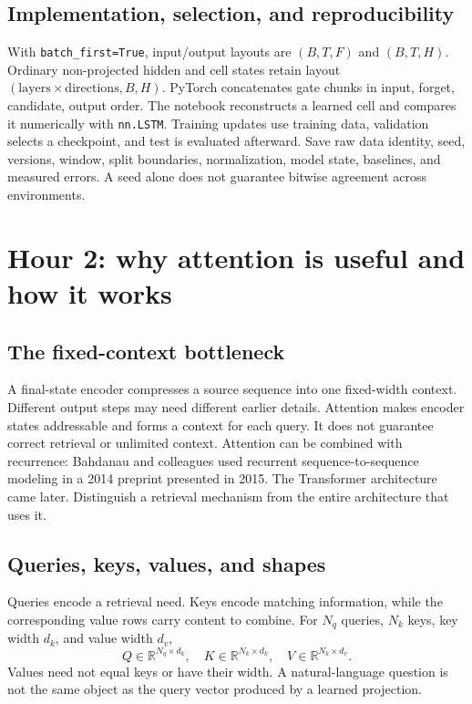 \subsection{Implementation, selection, and reproducibility}
With \texttt{batch\_first=True}, input/output layouts are $(B,T,F)$ and
$(B,T,H)$. Ordinary non-projected hidden and cell states retain layout
$(\mathrm{layers}\times\mathrm{directions},B,H)$. PyTorch concatenates
gate chunks in input, forget, candidate, output order. The notebook
reconstructs a learned cell and compares it numerically with \texttt{nn.LSTM}.
Training updates use training data, validation selects a checkpoint, and
test is evaluated afterward. Save raw data identity, seed, versions, window,
split boundaries, normalization, model state, baselines, and measured errors.
A seed alone does not guarantee bitwise agreement across environments.

\section{Hour 2: why attention is useful and how it works}
\subsection{The fixed-context bottleneck}
A final-state encoder compresses a source sequence into one fixed-width
context. Different output steps may need different earlier details.
Attention makes encoder states addressable and forms a context for each
query. It does not guarantee correct retrieval or unlimited context.
Attention can be combined with recurrence: Bahdanau and colleagues used
recurrent sequence-to-sequence modeling in a 2014 preprint presented in
2015. The Transformer architecture came later. Distinguish a retrieval
mechanism from the entire architecture that uses it.

\subsection{Queries, keys, values, and shapes}
Queries encode a retrieval need. Keys encode matching information, while
the corresponding value rows carry content to combine. For $N_q$ queries,
$N_k$ keys, key width $d_k$, and value width $d_v$,
\[Q\in\mathbb R^{N_q\times d_k},\quad
K\in\mathbb R^{N_k\times d_k},\quad V\in\mathbb R^{N_k\times d_v}.\]
Values need not equal keys or have their width. A natural-language question
is not the same object as the query vector produced by a learned projection.

